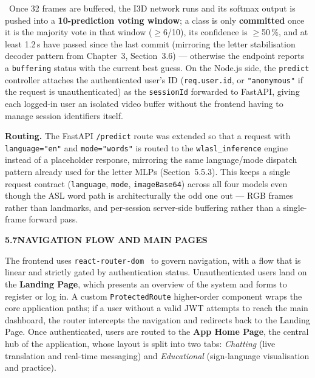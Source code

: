 \clearpage
\noindent\ Once 32 frames are buffered, the I3D network runs and its softmax output is pushed into a \textbf{10-prediction voting window}; a class is only \textbf{committed} once it is the majority vote in that window ($\geq$6/10), its confidence is $\geq$50\,\%, and at least 1.2\,s have passed since the last commit (mirroring the letter stabilisation decoder pattern from Chapter~3, Section~3.6) --- otherwise the endpoint reports a \texttt{buffering} status with the current best guess. On the Node.js side, the \texttt{predict} controller attaches the authenticated user's ID (\texttt{req.user.id}, or \texttt{"anonymous"} if the request is unauthenticated) as the \texttt{sessionId} forwarded to FastAPI, giving each logged-in user an isolated video buffer without the frontend having to manage session identifiers itself.\par\vspace{0.2cm}

\noindent\textbf{Routing.} The FastAPI \texttt{/predict} route was extended so that a request with \texttt{language="en"} and \texttt{mode="words"} is routed to the \texttt{wlasl\_inference} engine instead of a placeholder response, mirroring the same language/mode dispatch pattern already used for the letter MLPs (Section~5.5.3). This keeps a single request contract (\texttt{language}, \texttt{mode}, \texttt{imageBase64}) across all four models even though the ASL word path is architecturally the odd one out --- RGB frames rather than landmarks, and per-session server-side buffering rather than a single-frame forward pass.\par\vspace{0.3cm}

\noindent\textbf{5.7\quad NAVIGATION FLOW AND MAIN PAGES}\par
{}
\vspace{0.2cm}

\noindent The frontend uses \texttt{react-router-dom}~\cite{reactrouter2024} to govern navigation, with a flow that is linear and strictly gated by authentication status. Unauthenticated users land on the \textbf{Landing Page}, which presents an overview of the system and forms to register or log in. A custom \texttt{ProtectedRoute} higher-order component wraps the core application paths; if a user without a valid JWT attempts to reach the main dashboard, the router intercepts the navigation and redirects back to the Landing Page. Once authenticated, users are routed to the \textbf{App Home Page}, the central hub of the application, whose layout is split into two tabs: \textit{Chatting} (live translation and real-time messaging) and \textit{Educational} (sign-language visualisation and practice).\par\vspace{0.2cm}

